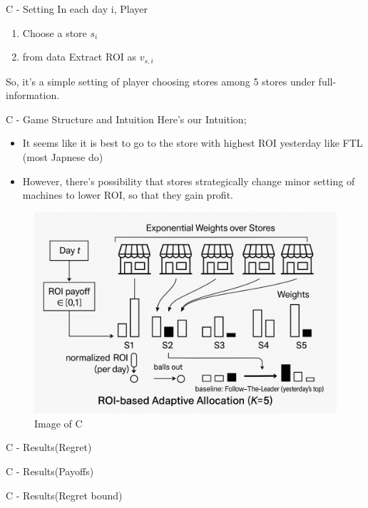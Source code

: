 \documentclass{beamer}
\begin{document}
\begin{frame}{C - Setting}
In each day i, Player
\begin{enumerate}
  \item Choose a store $s_i$ 
  \item from data Extract ROI as $v_{s,i}$
\end{enumerate}
\vspace{1em}
So, it's a simple setting of player choosing stores among 5 stores under full-information.

\end{frame}

\begin{frame}{C - Game Structure and Intuition}
Here's our Intuition;
\begin{itemize}
    \item It seems like it is best to go to the store with highest ROI yesterday like FTL (most Japnese do)
    \item However, there's possibility that stores strategically change minor setting of machines to lower ROI, so that they gain profit. 
\end{itemize}
\begin{figure}
    \centering
    \includegraphics[width=0.4\linewidth]{332Project2//figures/Image_C.png}
    \caption{Image of C}
    \label{fig:placeholder}
\end{figure}

\end{frame}

\begin{frame}{C - Results(Regret)}

    
\end{frame}


\begin{frame}{C - Results(Payoffs)}

    
\end{frame}

\begin{frame}{C - Results(Regret bound)}

    
\end{frame}
\end{document}
